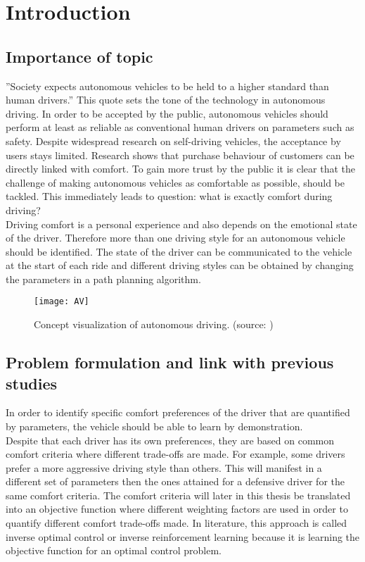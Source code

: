 \chapter{Introduction}
\label{cha:intro}
\section{Importance of topic} \label{s:importance_topic}
''Society expects autonomous vehicles to be held to a higher standard than human drivers.'' \cite{Prof.Amnon} This quote sets the tone of the technology in autonomous driving. In order to be accepted by the public, autonomous vehicles should perform at least as reliable as conventional human drivers on parameters such as safety. Despite widespread research on self-driving vehicles, the acceptance by users stays limited.\cite{Bae2019} Research shows that purchase behaviour of customers can be directly linked with comfort. To gain more trust by the public it is clear that the challenge of making autonomous vehicles as comfortable as possible, should be tackled. This immediately leads to question: what is exactly comfort during driving?\\
Driving comfort is a personal experience and also depends on the emotional state of the driver. Therefore more than one driving style for an autonomous vehicle should be identified. \cite{Eindhoven2019} The state of the driver can be communicated to the vehicle at the start of each ride and different driving styles can be obtained by changing the parameters in a path planning algorithm. 

\begin{figure}[h!]
	\centering
	\texttt{[image: AV]}
	\caption{Concept visualization of autonomous driving. (source: \cite{AV})}
	\label{fig:AV}
\end{figure} 
\newpage

\section{Problem formulation and link with previous studies}
In order to identify specific comfort preferences of the driver that are quantified by parameters, the vehicle should be able to learn by demonstration. \cite{Kuderer2015a}\\
Despite that each driver has its own preferences, they are based on common comfort criteria where different trade-offs are made. For example, some drivers prefer a more aggressive driving style than others. This will manifest in a different set of parameters then the ones attained for a defensive driver for the same comfort criteria. The comfort criteria will later in this thesis be translated into an objective function where different weighting factors are used in order to quantify different comfort trade-offs made. In literature, this approach is called inverse optimal control or inverse reinforcement learning because it is learning the objective function for an optimal control problem.\\

